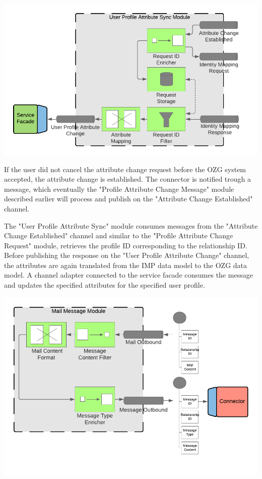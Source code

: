\begin{center}
    \includegraphics[scale=0.6]{Diagrams/Integration Architecture 1/Technological Integration/11. User Profile Attribute Sync Module.pdf}
\end{center}

If the user did not cancel the attribute change request before the OZG system accepted, the attribute change is established. The connector is notified trough a message, which eventually the "Profile Attribute Change Message" module described earlier will process and publish on the "Attribute Change Established" channel.

The "User Profile Attribute Sync" module consumes messages from the "Attribute Change Established" channel and similar to the "Profile Attribute Change Request" module, retrieves the profile ID corresponding to the relationship ID. Before publishing the response on the "User Profile Attribute Change" channel, the attributes are again translated from the IMP data model to the OZG data model. A channel adapter connected to the service facade consumes the message and updates the specified attributes for the specified user profile. 

\begin{center}
    \includegraphics[scale=0.6]{Diagrams/Integration Architecture 1/Technological Integration/12. Mail Message Module.pdf}
\end{center}

